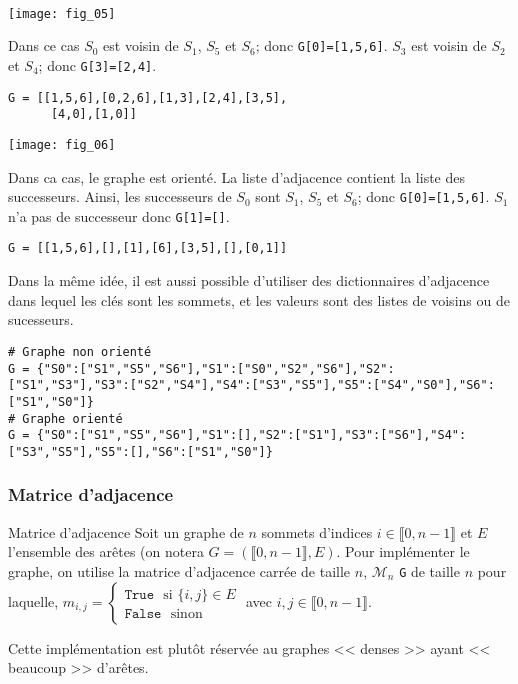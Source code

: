 \begin{exemple} ~\\
\begin{minipage}[b]{.47\linewidth}
\begin{center}
\texttt{[image: fig\_05]}
\end{center}
Dans ce cas $S_0$ est voisin de $S_1$, $S_5$ et $S_6$; donc \texttt{G[0]=[1,5,6]}. 
$S_3$ est voisin de $S_2$ et $S_4$; donc \texttt{G[3]=[2,4]}.
\begin{lstlisting}
G = [[1,5,6],[0,2,6],[1,3],[2,4],[3,5],
      [4,0],[1,0]]
\end{lstlisting}
\end{minipage}\hfill
\begin{minipage}[b]{.47\linewidth}
\begin{center}
\texttt{[image: fig\_06]}
\end{center}
Dans ca cas, le graphe est orienté. La liste d'adjacence contient la liste des successeurs. Ainsi, les successeurs de $S_0$ sont $S_1$, $S_5$ et $S_6$; donc \texttt{G[0]=[1,5,6]}. $S_1$ n'a pas de successeur donc \texttt{G[1]=[]}.
\begin{lstlisting}
G = [[1,5,6],[],[1],[6],[3,5],[],[0,1]]
\end{lstlisting}
\end{minipage}


Dans la même idée, il est aussi possible d'utiliser des dictionnaires d'adjacence dans lequel les clés sont les sommets, et les valeurs sont des listes de voisins ou de sucesseurs. 
\begin{lstlisting}
# Graphe non orienté 
G = {"S0":["S1","S5","S6"],"S1":["S0","S2","S6"],"S2":["S1","S3"],"S3":["S2","S4"],"S4":["S3","S5"],"S5":["S4","S0"],"S6":["S1","S0"]}
# Graphe orienté 
G = {"S0":["S1","S5","S6"],"S1":[],"S2":["S1"],"S3":["S6"],"S4":["S3","S5"],"S5":[],"S6":["S1","S0"]}
\end{lstlisting}

\end{exemple}

\subsubsection{Matrice d'adjacence}
\begin{defi}{Matrice d'adjacence}
Soit un graphe de $n$ sommets d'indices $i \in \llbracket 0, n-1\rrbracket$ et $E$ l'ensemble des arêtes 
(on notera $G=\left( \llbracket 0, n-1\rrbracket,E\right)$. Pour implémenter le graphe, on utilise la matrice d'adjacence carrée de taille $n$, $\mathcal{M}_n$ \texttt{G} de taille $n$ pour laquelle,
$m_{i,j}=\left\{
\begin{array}{l}
\texttt{True } \text{ si } \{i,j\}\in E\\
\texttt{False } \text{ sinon } 
\end{array}
\right.$ avec $i,j\in \llbracket 0, n-1\rrbracket$. 


\end{defi}
\begin{rem}
Cette implémentation est plutôt réservée au graphes << denses >> ayant << beaucoup >> d'arêtes.
\end{rem}


